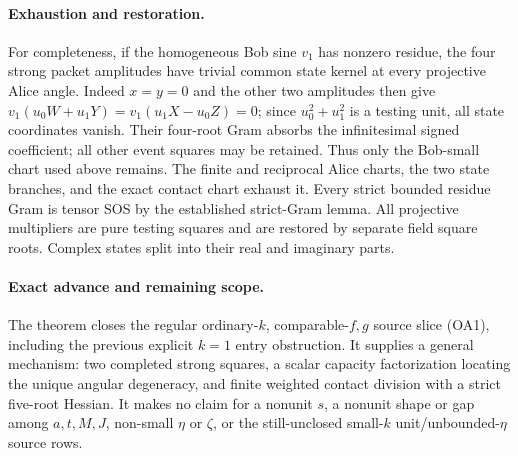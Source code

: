 \paragraph{Exhaustion and restoration.}
For completeness, if the homogeneous Bob sine $v_1$ has nonzero
residue, the four strong packet amplitudes have trivial common state
kernel at every projective Alice angle. Indeed $x=y=0$ and the other
two amplitudes then give
$v_1(u_0W+u_1Y)=v_1(u_1X-u_0Z)=0$; since
$u_0^2+u_1^2$ is a testing unit, all state coordinates vanish.
Their four-root Gram absorbs the infinitesimal signed coefficient;
all other event squares may be retained. Thus only the Bob-small
chart used above remains. The finite and reciprocal Alice charts,
the two state branches, and the exact contact chart exhaust it.
Every strict bounded residue Gram is tensor SOS by the established
strict-Gram lemma. All projective multipliers are pure testing squares
and are restored by separate field square roots. Complex states split
into their real and imaginary parts.

\paragraph{Exact advance and remaining scope.}
The theorem closes the regular ordinary-$k$, comparable-$f,g$ source
slice (OA1), including the previous explicit $k=1$ entry obstruction.
It supplies a general mechanism: two completed strong squares, a
scalar capacity factorization locating the unique angular degeneracy,
and finite weighted contact division with a strict five-root Hessian.
It makes no claim for a nonunit $s$, a nonunit shape or gap among
$a,t,M,J$, non-small $\eta$ or $\zeta$, or the still-unclosed
small-$k$ unit/unbounded-$\eta$ source rows.
